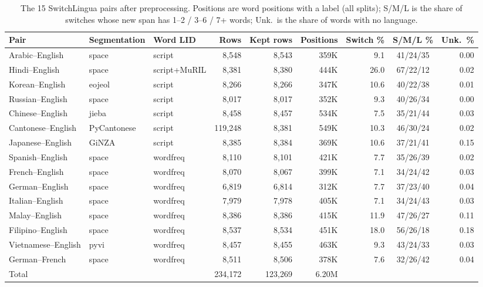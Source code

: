 \documentclass[sigconf]{acmart}
\begin{document}
\begin{table}[t]
\caption{The 15 SwitchLingua pairs after preprocessing. Positions are word positions with a label (all splits); S/M/L
is the share of switches whose new span has 1--2 / 3--6 / 7+ words; Unk.\ is the share of words with no language.}
\label{tab:data}
\small
\begin{tabular}{lllrrrrcr}
\toprule
Pair & Segmentation & Word LID & Rows & Kept rows & Positions & Switch \% & S/M/L \% & Unk.\ \%\\
\midrule
Arabic--English & space & script & 8,548 & 8,543 & 359K & 9.1 & 41/24/35 & 0.00\\
Hindi--English & space & script+MuRIL & 8,381 & 8,380 & 444K & 26.0 & 67/22/12 & 0.02\\
Korean--English & eojeol & script & 8,266 & 8,266 & 347K & 10.6 & 40/22/38 & 0.01\\
Russian--English & space & script & 8,017 & 8,017 & 352K & 9.3 & 40/26/34 & 0.00\\
Chinese--English & jieba & script & 8,458 & 8,457 & 534K & 7.5 & 35/21/44 & 0.03\\
Cantonese--English & PyCantonese & script & 119,248 & 8,381 & 549K & 10.3 & 46/30/24 & 0.02\\
Japanese--English & GiNZA & script & 8,385 & 8,384 & 369K & 10.6 & 37/21/41 & 0.15\\
Spanish--English & space & wordfreq & 8,110 & 8,101 & 421K & 7.7 & 35/26/39 & 0.02\\
French--English & space & wordfreq & 8,070 & 8,067 & 399K & 7.1 & 34/24/42 & 0.03\\
German--English & space & wordfreq & 6,819 & 6,814 & 312K & 7.7 & 37/23/40 & 0.04\\
Italian--English & space & wordfreq & 7,979 & 7,978 & 405K & 7.1 & 34/24/43 & 0.03\\
Malay--English & space & wordfreq & 8,386 & 8,386 & 415K & 11.9 & 47/26/27 & 0.11\\
Filipino--English & space & wordfreq & 8,537 & 8,534 & 451K & 18.0 & 56/26/18 & 0.18\\
Vietnamese--English & pyvi & wordfreq & 8,457 & 8,455 & 463K & 9.3 & 43/24/33 & 0.03\\
German--French & space & wordfreq & 8,511 & 8,506 & 378K & 7.6 & 32/26/42 & 0.04\\
\midrule
Total & & & 234,172 & 123,269 & 6.20M & & & \\
\bottomrule
\end{tabular}
\end{table}
\end{document}

